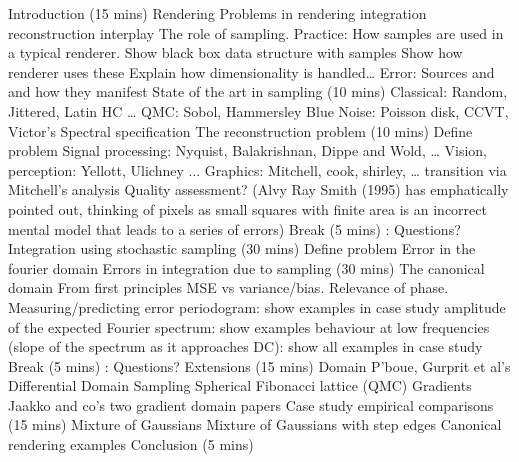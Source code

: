 Introduction (15 mins)
Rendering
Problems in rendering
integration
reconstruction
interplay
The role of sampling.
Practice: 
How samples are used in a typical renderer. 
Show black box data structure with samples
Show how renderer uses these
Explain how dimensionality is handled…
Error: Sources and and how they manifest
State of the art in sampling (10 mins) 
Classical: Random, Jittered, Latin HC …
QMC: Sobol, Hammersley 
Blue Noise: Poisson disk, CCVT, Victor’s 
Spectral specification
The reconstruction problem (10 mins)
Define problem
Signal processing: Nyquist, Balakrishnan, Dippe and Wold, …
Vision, perception: Yellott, Ulichney ...
Graphics: Mitchell, cook, shirley, …
transition via Mitchell’s analysis
Quality assessment? 
(Alvy Ray Smith (1995) has emphatically pointed out, thinking of pixels as small squares with finite area is an incorrect mental model that leads to a series of errors)
Break (5 mins) : Questions? 
Integration using stochastic sampling (30 mins) 
Define problem
Error in the fourier domain
Errors in integration due to sampling (30 mins)
The canonical domain
From first principles
MSE vs variance/bias. Relevance of phase.
Measuring/predicting error
periodogram: show examples in case study
amplitude of the expected Fourier spectrum: show examples 
behaviour at low frequencies (slope of the spectrum as it approaches DC): show all examples in case study
Break (5 mins) : Questions? 
Extensions (15 mins)
Domain
P’boue, Gurprit et al’s
Differential Domain Sampling
Spherical Fibonacci lattice (QMC)
Gradients
Jaakko and co’s two gradient domain papers
Case study empirical comparisons (15 mins) 
Mixture of Gaussians
Mixture of Gaussians with step edges
Canonical rendering examples
Conclusion (5 mins)
